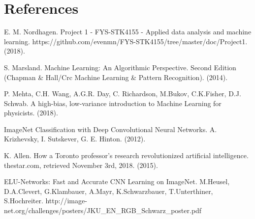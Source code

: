 \newpage
\section{References}

\begingroup
\renewcommand{\section}[2]{}
\begin{thebibliography}{}
	E. M. Nordhagen.
	Project 1 - FYS-STK4155 - Applied data analysis and machine learning.
	https://github.com/evenmn/FYS-STK4155/tree/master/doc/Project1.
	(2018).
	
	S. Marsland.
	Machine Learning: An Algorithmic Perspective. Second Edition (Chapman \& Hall/Crc Machine Learning \& Pattern Recognition).
	(2014).
	
	P. Mehta, C.H. Wang, A.G.R. Day, C. Richardson, M.Bukov, C.K.Fisher, D.J. Schwab.
	A high-bias, low-variance introduction to Machine Learning for physicists.
	(2018).
	
	ImageNet Classification with Deep Convolutional Neural Networks.
	A. Krizhevsky, I. Sutskever, G. E. Hinton.
	(2012).
	
	K. Allen.
	How a Toronto professor’s research revolutionized artificial intelligence.
	thestar.com, retrieved November 3rd, 2018.
	(2015).
	
	ELU-Networks: Fast and Accurate CNN Learning on ImageNet.
	M.Heusel, D.A.Clevert, G.Klambauer, A.Mayr, K.Schwarzbauer, T.Unterthiner, S.Hochreiter.
	http://image-net.org/challenges/posters/JKU\_EN\_RGB\_Schwarz\_poster.pdf
	
\end{thebibliography}
\endgroup